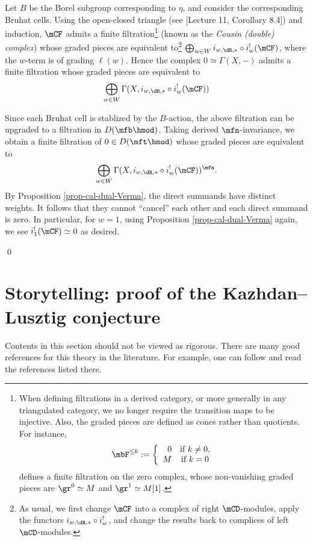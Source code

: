 		Let $B$ be the Borel subgroup corresponding to $\eta$, and consider the corresponding Bruhat cells. Using the open-closed triangle (see [Lecture 11, Corollary 8.4]) and induction, $\mCF$ admits a finite filtration\footnote{When defining filtrations in a derived category, or more generally in any triangulated category, we no longer require the transition maps to be injective. Also, the graded pieces are defined as cones rather than quotients. For instance, 
		\[
			\mbF^{\le k}:=\left\{ 
				\begin{array}{rcl}  
						0	&	\textrm{if } k\neq 0,\\
						M	&	\textrm{if } k=0
				\end{array}\right.
		\]
		defines a finite filtration on the zero complex, whose non-vanishing graded pieces are $\gr^0 \simeq M$ and $\gr^1\simeq M[1]$.} (known as the \emph{Cousin (double) complex}) whose graded pieces are equivalent to\footnote{As usual, we first change $\mCF$ into a complex of right $\mCD$-modules, apply the functors $i_{w,\dR,*}\circ i_w^!$, and change the results back to complices of left $\mCD$-modules.} $\bigoplus_{w\in W} i_{w,\dR,*}\circ i_w^! (\mCF)$, where the $w$-term is of grading $\ell(w)$. Hence the complex $0\simeq \Gamma(X,-)$ admits a finite filtration whose graded pieces are equivalent to
		\[
			\bigoplus_{w\in W}  \Gamma(X, i_{w,\dR,*}\circ i_w^! (\mCF) )
		\]

		Since each Bruhat cell is stablized by the $B$-action, the above filtration can be upgraded to a filtration in $D(\mfb\hmod)$. Taking derived $\mfn$-invariance, we obtain a finite filtration of $0\in D(\mft\hmod)$ whose graded pieces are equivalent to 
		\[
			\bigoplus_{w\in W}  \Gamma(X, i_{w,\dR,*}\circ i_w^! (\mCF) )^\mfn.
		\]
		By Proposition \ref{prop-cal-dual-Verma}, the direct summands have distinct weights. It follows that they cannot ``cancel'' each other and each direct summand is zero. In particular, for $w=1$, using Proposition \ref{prop-cal-dual-Verma} again, we see $i_1^!(\mCF)\simeq 0$ as desired.


	\qed

	\section{Storytelling: proof of the Kazhdan--Lusztig conjecture}

	Contents in this section should not be viewed as rigorous. There are many good references for this theory in the literature. For example, one can follow \cite{EMTW} and read the references listed there.


